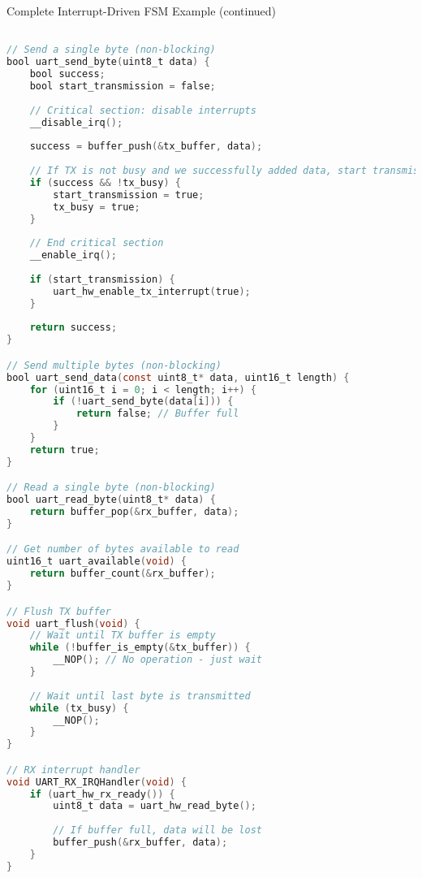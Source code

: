 \begin{example2}{Complete Interrupt-Driven FSM Example (continued)}
\begin{lstlisting}[language=C, style=basesmol]

// Send a single byte (non-blocking)
bool uart_send_byte(uint8_t data) {
    bool success;
    bool start_transmission = false;
    
    // Critical section: disable interrupts
    __disable_irq();
    
    success = buffer_push(&tx_buffer, data);
    
    // If TX is not busy and we successfully added data, start transmission
    if (success && !tx_busy) {
        start_transmission = true;
        tx_busy = true;
    }
    
    // End critical section
    __enable_irq();
    
    if (start_transmission) {
        uart_hw_enable_tx_interrupt(true);
    }
    
    return success;
}

// Send multiple bytes (non-blocking)
bool uart_send_data(const uint8_t* data, uint16_t length) {
    for (uint16_t i = 0; i < length; i++) {
        if (!uart_send_byte(data[i])) {
            return false; // Buffer full
        }
    }
    return true;
}

// Read a single byte (non-blocking)
bool uart_read_byte(uint8_t* data) {
    return buffer_pop(&rx_buffer, data);
}

// Get number of bytes available to read
uint16_t uart_available(void) {
    return buffer_count(&rx_buffer);
}

// Flush TX buffer
void uart_flush(void) {
    // Wait until TX buffer is empty
    while (!buffer_is_empty(&tx_buffer)) {
        __NOP(); // No operation - just wait
    }
    
    // Wait until last byte is transmitted
    while (tx_busy) {
        __NOP();
    }
}

// RX interrupt handler
void UART_RX_IRQHandler(void) {
    if (uart_hw_rx_ready()) {
        uint8_t data = uart_hw_read_byte();
        
        // If buffer full, data will be lost
        buffer_push(&rx_buffer, data);
    }
}

\end{lstlisting}
\end{example2}

